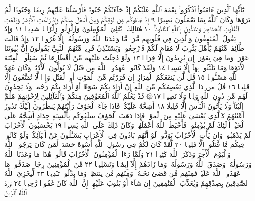 يَٰٓأَيُّهَا ٱلَّذِينَ ءَامَنُوا۟ ٱذْكُرُوا۟ نِعْمَةَ ٱللَّهِ عَلَيْكُمْ إِذْ جَآءَتْكُمْ
جُنُودࣱ فَأَرْسَلْنَا عَلَيْهِمْ رِيحࣰا وَجُنُودࣰا لَّمْ تَرَوْهَاۚ وَكَانَ ٱللَّهُ
بِمَا تَعْمَلُونَ بَصِيرًا ٩ إِذْ جَآءُوكُم مِّن فَوْقِكُمْ وَمِنْ أَسْفَلَ
مِنكُمْ وَإِذْ زَاغَتِ ٱلْأَبْصَٰرُ وَبَلَغَتِ ٱلْقُلُوبُ ٱلْحَنَاجِرَ
وَتَظُنُّونَ بِٱللَّهِ ٱلظُّنُونَا۠ ١٠ هُنَالِكَ ٱبْتُلِيَ ٱلْمُؤْمِنُونَ وَزُلْزِلُوا۟
زِلْزَالࣰا شَدِيدࣰا ١١ وَإِذْ يَقُولُ ٱلْمُنَٰفِقُونَ وَٱلَّذِينَ فِي قُلُوبِهِم
مَّرَضࣱ مَّا وَعَدَنَا ٱللَّهُ وَرَسُولُهُۥٓ إِلَّا غُرُورࣰا ١٢ وَإِذْ قَالَت طَّآئِفَةࣱ
مِّنْهُمْ يَٰٓأَهْلَ يَثْرِبَ لَا مُقَامَ لَكُمْ فَٱرْجِعُوا۟ۚ وَيَسْتَـْٔذِنُ فَرِيقࣱ
مِّنْهُمُ ٱلنَّبِيَّ يَقُولُونَ إِنَّ بُيُوتَنَا عَوْرَةࣱ وَمَا هِيَ بِعَوْرَةٍۖ إِن يُرِيدُونَ
إِلَّا فِرَارࣰا ١٣ وَلَوْ دُخِلَتْ عَلَيْهِم مِّنْ أَقْطَارِهَا ثُمَّ سُئِلُوا۟ ٱلْفِتْنَةَ
لَأٓتَوْهَا وَمَا تَلَبَّثُوا۟ بِهَآ إِلَّا يَسِيرࣰا ١٤ وَلَقَدْ كَانُوا۟ عَٰهَدُوا۟
ٱللَّهَ مِن قَبْلُ لَا يُوَلُّونَ ٱلْأَدْبَٰرَۚ وَكَانَ عَهْدُ ٱللَّهِ مَسْـُٔولࣰا ١٥
قُل لَّن يَنفَعَكُمُ ٱلْفِرَارُ إِن فَرَرْتُم مِّنَ ٱلْمَوْتِ أَوِ ٱلْقَتْلِ وَإِذࣰا
لَّا تُمَتَّعُونَ إِلَّا قَلِيلࣰا ١٦ قُلْ مَن ذَا ٱلَّذِي يَعْصِمُكُم مِّنَ ٱللَّهِ
إِنْ أَرَادَ بِكُمْ سُوٓءًا أَوْ أَرَادَ بِكُمْ رَحْمَةࣰۚ وَلَا يَجِدُونَ لَهُم مِّن دُونِ
ٱللَّهِ وَلِيࣰّا وَلَا نَصِيرࣰا ١٧۞ قَدْ يَعْلَمُ ٱللَّهُ ٱلْمُعَوِّقِينَ مِنكُمْ وَٱلْقَآئِلِينَ
لِإِخْوَٰنِهِمْ هَلُمَّ إِلَيْنَاۖ وَلَا يَأْتُونَ ٱلْبَأْسَ إِلَّا قَلِيلًا ١٨ أَشِحَّةً
عَلَيْكُمْۖ فَإِذَا جَآءَ ٱلْخَوْفُ رَأَيْتَهُمْ يَنظُرُونَ إِلَيْكَ تَدُورُ أَعْيُنُهُمْ
كَٱلَّذِي يُغْشَىٰ عَلَيْهِ مِنَ ٱلْمَوْتِۖ فَإِذَا ذَهَبَ ٱلْخَوْفُ سَلَقُوكُم
بِأَلْسِنَةٍ حِدَادٍ أَشِحَّةً عَلَى ٱلْخَيْرِۚ أُو۟لَٰٓئِكَ لَمْ يُؤْمِنُوا۟ فَأَحْبَطَ
ٱللَّهُ أَعْمَٰلَهُمْۚ وَكَانَ ذَٰلِكَ عَلَى ٱللَّهِ يَسِيرࣰا ١٩ يَحْسَبُونَ
ٱلْأَحْزَابَ لَمْ يَذْهَبُوا۟ۖ وَإِن يَأْتِ ٱلْأَحْزَابُ يَوَدُّوا۟ لَوْ أَنَّهُم
بَادُونَ فِي ٱلْأَعْرَابِ يَسْـَٔلُونَ عَنْ أَنۢبَآئِكُمْۖ وَلَوْ كَانُوا۟ فِيكُم
مَّا قَٰتَلُوٓا۟ إِلَّا قَلِيلࣰا ٢٠ لَّقَدْ كَانَ لَكُمْ فِي رَسُولِ ٱللَّهِ أُسْوَةٌ حَسَنَةࣱ
لِّمَن كَانَ يَرْجُوا۟ ٱللَّهَ وَٱلْيَوْمَ ٱلْأٓخِرَ وَذَكَرَ ٱللَّهَ كَثِيرࣰا ٢١
وَلَمَّا رَءَا ٱلْمُؤْمِنُونَ ٱلْأَحْزَابَ قَالُوا۟ هَٰذَا مَا وَعَدَنَا ٱللَّهُ وَرَسُولُهُۥ
وَصَدَقَ ٱللَّهُ وَرَسُولُهُۥۚ وَمَا زَادَهُمْ إِلَّآ إِيمَٰنࣰا وَتَسْلِيمࣰا ٢٢
مِّنَ ٱلْمُؤْمِنِينَ رِجَالࣱ صَدَقُوا۟ مَا عَٰهَدُوا۟ ٱللَّهَ عَلَيْهِۖ فَمِنْهُم مَّن
قَضَىٰ نَحْبَهُۥ وَمِنْهُم مَّن يَنتَظِرُۖ وَمَا بَدَّلُوا۟ تَبْدِيلࣰا ٢٣ لِّيَجْزِيَ
ٱللَّهُ ٱلصَّٰدِقِينَ بِصِدْقِهِمْ وَيُعَذِّبَ ٱلْمُنَٰفِقِينَ إِن شَآءَ أَوْ
يَتُوبَ عَلَيْهِمْۚ إِنَّ ٱللَّهَ كَانَ غَفُورࣰا رَّحِيمࣰا ٢٤ وَرَدَّ ٱللَّهُ ٱلَّذِينَ
